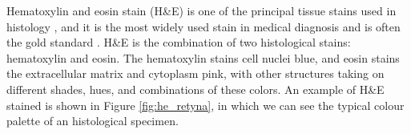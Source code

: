 Hematoxylin and eosin stain (H\&E) is one of the principal tissue stains used in histology \cite{he_stain}, and it is the most widely used stain in medical diagnosis and is often the gold standard \cite{Rosai2007}. H\&E is the combination of two histological stains: hematoxylin and eosin. The hematoxylin stains cell nuclei blue, and eosin stains the extracellular matrix and cytoplasm pink, with other structures taking on different shades, hues, and combinations of these colors. An example of H\&E stained is shown in Figure \ref{fig:he_retyna}, in which we can see the typical colour palette of an histological specimen.
